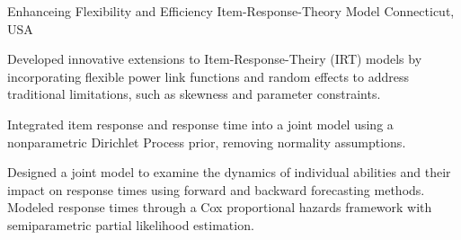 

\begin{cventries}

  \cventry
    {} %
    {Enhanceing Flexibility and Efficiency Item-Response-Theory Model} %
    {Connecticut, USA} %
    {} %
    {
      \begin{cvitems} %
        \item {Developed innovative extensions to Item-Response-Theiry (IRT) models by incorporating flexible power link functions and random effects to address traditional limitations, such as skewness and parameter constraints.}
        \item {Integrated item response and response time into a joint model using a nonparametric Dirichlet Process prior, removing normality assumptions.}
        \item {Designed a joint model to examine the dynamics of individual abilities and their impact on response times using forward and backward forecasting methods. Modeled response times through a Cox proportional hazards framework with semiparametric partial likelihood estimation.}
      \end{cvitems}
    }

    
\end{cventries}
